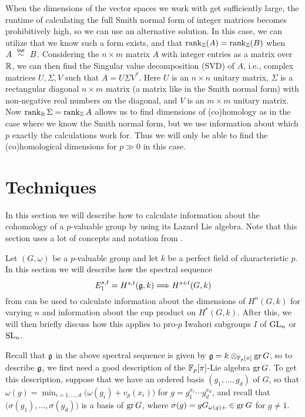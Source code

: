 \begin{remark}
  When the dimensions of the vector spaces we work with get sufficiently large, the runtime of calculating the full Smith normal form of integer matrices becomes prohibitively high, so we can use an alternative solution. In this case, we can utilize that we know such a form exists, and that $\operatorname{rank}_{\mathbb{Z}}(A) = \operatorname{rank}_{\mathbb{Z}}(B)$ when $A \snfsim B$. Considering the $n \times m$ matrix $A$ with integer entries as a matrix over $\mathbb{R}$, we can then find the Singular value decomposition (SVD) of $A$, i.e., complex matrices $U,\Sigma,V$ such that $A = U\Sigma V^{*}$. Here $U$ is an $n \times n$ unitary matrix, $\Sigma$ is a rectangular diagonal $n \times m$ matrix (a matrix like in the Smith normal form) with non-negative real numbers on the diagonal, and $V$ is an $m \times m$ unitary matrix. Now $\operatorname{rank}_{\mathbb{R}} \Sigma = \operatorname{rank}_{\mathbb{Z}} A$ allows us to find dimensions of (co)homology as in the case where we know the Smith normal form, but we use information about which $p$ exactly the calculations work for. Thus we will only be able to find the (co)homological dimensions for $p \gg 0$ in this case.
\end{remark}

\section{Techniques}%
\label{sec:tech-iwa}

In this section we will describe how to calculate information about the cohomology of a $p$-valuable group by using its Lazard Lie algebra. Note that this section uses a lot of concepts and notation from .

Let $(G, \omega)$ be a $p$-valuable group and let $k$ be a perfect field of characteristic $p$. In this section we will describe how the spectral sequence
\begin{equation}\label{eq:spec-sec-tech}
  E_{1}^{s,t} = H^{s,t}(\mathfrak{g}, k) \Longrightarrow H^{s+t}(G, k)
\end{equation}
from \cite[§6.1]{Sor} can be used to calculate information about the dimensions of $H^{n}(G,k)$ for varying $n$ and information about the cup product on $H^{*}(G,k)$. After this, we will then briefly discuss how this applies to pro-$p$ Iwahori subgroups $I$ of $\operatorname{GL}_{n}$ or $\operatorname{SL}_{n}$.

Recall that $\mathfrak{g}$ in the above spectral sequence is given by $\mathfrak{g} = k \otimes_{\mathbb{F}_{p}[\pi]} \operatorname{gr} G$, so to describe $\mathfrak{g}$, we first need a good description of the $\mathbb{F}_{p}[\pi]$-Lie algebra $\operatorname{gr} G$. To get this description, suppose that we have an ordered basis $(g_{1},\dotsc,g_{d})$ of $G$, so that $\omega(g) = \min_{i = 1,\dotsc,d} \bigl( \omega(g_{i}) + v_{p}(x_{i}) \bigr)$ for $g = g_{1}^{x_{1}} \dotsb g_{d}^{x_{d}}$, and recall that $\bigl( \sigma(g_{1}),\dotsc,\sigma(g_{d}) \bigr)$ is a basis of $\operatorname{gr} G$, where $\sigma(g) = gG_{\omega(g)+} \in \operatorname{gr} G$ for $g \neq 1$.


